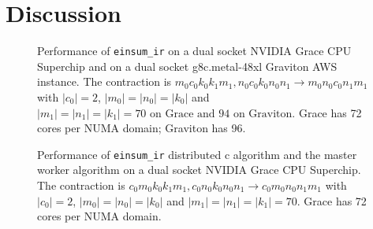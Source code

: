 \section{Discussion}

\begin{figure}[ht]
  \caption{
    Performance of \texttt{einsum\_ir} on a dual socket NVIDIA Grace CPU Superchip and on a dual socket g8c.metal-48xl Graviton AWS instance.
    The contraction is $m_0c_0k_0k_1m_1, n_0c_0k_0n_0n_1 \rightarrow m_0n_0c_0n_1m_1$ with $|c_0|=2$, $|m_0|=|n_0|=|k_0|$ and $|m_1|=|n_1|=|k_1|=70\text{ on Grace and } 94\text{ on Graviton}$.
    Grace has 72 cores per NUMA domain; Graviton has 96.
    }
  \label{fig:einsum_ir_perf}
\end{figure}

\begin{figure}[ht]
  \caption{
    Performance of \texttt{einsum\_ir} distributed c algorithm and the master worker algorithm on a dual socket NVIDIA Grace CPU Superchip.
    The contraction is $c_0m_0k_0k_1m_1, c_0n_0k_0n_0n_1 \rightarrow c_0m_0n_0n_1m_1$ with $|c_0|=2$, $|m_0|=|n_0|=|k_0|$ and $|m_1|=|n_1|=|k_1|=70$.
    Grace has 72 cores per NUMA domain.
    }
  \label{fig:master_worker_perf}
\end{figure}

